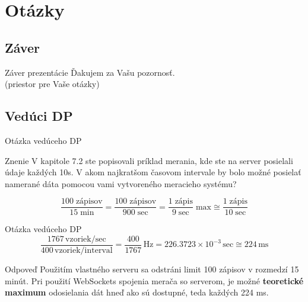 \documentclass[hyperref={unicode}]{beamer}
\begin{document}
\section{Otázky}
\label{sec:Otázky}

\subsection{Záver}
\label{sub:Záver}

\begin{frame}{Záver prezentácie}
	\centering
	{\Large Ďakujem za Vašu pozornosť.\\
	\vspace{1cm}
	(priestor pre Vaše otázky)}
\end{frame}



\subsection{Vedúci DP}
\label{sub:Vedúci}

\begin{frame}{Otázka vedúceho DP}
	\begin{block}{Znenie}
		V kapitole 7.2 ste popisovali príklad merania, kde ste na server posielali údaje každých 10s. V akom najkratšom časovom intervale by bolo možné posielať namerané dáta pomocou vami vytvoreného meracieho systému?
	\end{block}

	\begin{equation*}
		\frac{100\;\text{zápisov}}{15\;\text{min}} = \frac{100\;\text{zápisov}}{900\;\text{sec}} = \frac{1\;\text{zápis}}{9\;\text{sec}}\;\text{max} \cong \frac{1\;\text{zápis}}{10\;\text{sec}}
	\end{equation*}
\end{frame}



\begin{frame}{Otázka vedúceho DP}
	\begin{equation*}
		\frac{1767\,\text{vzoriek/sec}}{400\,\text{vzoriek/interval}} = \frac{400}{1767}\,\text{Hz} = 226.3723\times 10^{-3}\,\text{sec}\cong 224\,\text{ms}
	\end{equation*}

	\begin{block}{Odpoveď}
		Použitím vlastného serveru sa odstráni limit 100 zápisov v rozmedzí 15 minút. Pri použití WebSockets spojenia merača so serverom, je možné \textbf{teoretické maximum} odosielania dát hneď ako sú dostupné, teda každých 224 ms.
	\end{block}
\end{frame}
\end{document}
